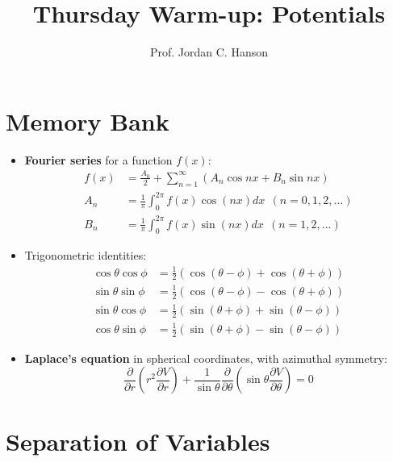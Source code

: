 \documentclass[10pt]{article}
\begin{document}
\twocolumn

\title{Thursday Warm-up: Potentials}
\author{Prof. Jordan C. Hanson}

\maketitle

\section{Memory Bank}

\small

\begin{itemize}
\item \textbf{Fourier series} for a function $f(x)$:
\begin{align}
f(x) &= \frac{A_0}{2} + \sum_{n=1}^{\infty} \left(A_n \cos nx + B_n \sin nx \right) \label{eq:1} \\
A_n &= \frac{1}{\pi}\int_0^{2\pi} f(x) \cos (nx) dx ~~ (n=0,1,2,...) \label{eq:2} \\
B_n &= \frac{1}{\pi}\int_0^{2\pi} f(x) \sin (nx) dx ~~ (n=1,2,...) \label{eq:3}
\end{align}
\item Trigonometric identities:
\begin{align}
\cos\theta\cos\phi &= \frac{1}{2}\left( \cos(\theta - \phi) + \cos(\theta + \phi) \right) \\
\sin\theta\sin\phi &= \frac{1}{2}\left( \cos(\theta - \phi) - \cos(\theta + \phi) \right) \\
\sin\theta\cos\phi &= \frac{1}{2}\left( \sin(\theta + \phi) + \sin(\theta - \phi) \right) \\
\cos\theta\sin\phi &= \frac{1}{2}\left( \sin(\theta + \phi) - \sin(\theta - \phi) \right)
\end{align}
\item \textbf{Laplace's equation} in spherical coordinates, with azimuthal symmetry:
\begin{equation}
\frac{\partial}{\partial r}\left(r^2\frac{\partial V}{\partial r}\right) + \frac{1}{\sin\theta}\frac{\partial}{\partial \theta}\left(\sin\theta \frac{\partial V}{\partial \theta}\right) = 0
\end{equation}
\end{itemize}

\section{Separation of Variables}
\end{document}
